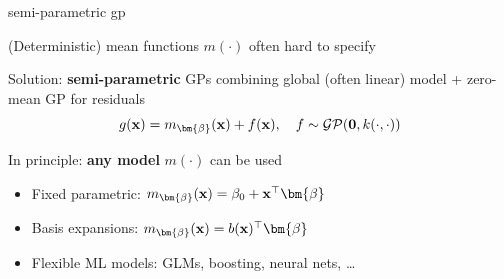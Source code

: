 \documentclass[11pt,compress,t,notes=noshow, xcolor=table]{beamer}
\begin{document}
\begin{framei}[sep=L]{semi-parametric gp}
\item (Deterministic) mean functions $m(\cdot)$ often hard to specify
\item Solution: \textbf{semi-parametric} GPs combining global (often linear) model + zero-mean GP for residuals
$$g(\xv) = m_{\bm{\beta}}(\xv) + \fx, \quad f  \sim \GPzk$$

\item In principle: \textbf{any model} $m(\cdot)$ can be used
\begin{itemize}
  \item Fixed parametric: $m_{\bm{\beta}}(\xv)=\beta_0+\xv^\top\bm{\beta}$
  \item Basis expansions: $m_{\bm{\beta}}(\xv)=b(\xv)^\top\bm{\beta}$
  \item Flexible ML models: GLMs, boosting, neural nets, \dots
\end{itemize}


\end{framei}


\end{document}
